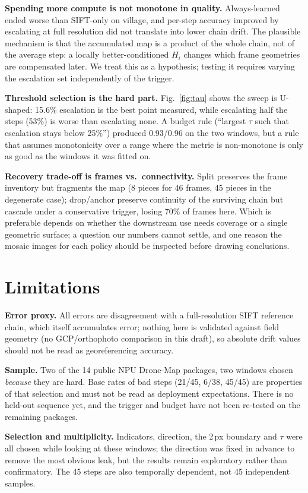 \documentclass[conference]{IEEEtran}
\begin{document}
\textbf{Spending more compute is not monotone in quality.} Always-learned
ended worse than SIFT-only on village, and per-step accuracy improved by
escalating at full resolution did not translate into lower chain drift. The
plausible mechanism is that the accumulated map is a product of the whole
chain, not of the average step: a locally better-conditioned $H_i$ changes
which frame geometries are compensated later. We treat this as a hypothesis;
testing it requires varying the escalation set independently of the trigger.

\textbf{Threshold selection is the hard part.} Fig.~\ref{fig:tau} shows the
sweep is U-shaped: 15.6\% escalation is the best point measured, while
escalating half the steps (53\%) is worse than escalating none. A budget rule
(``largest $\tau$ such that escalation stays below 25\%'') produced 0.93/0.96
on the two windows, but a rule that assumes monotonicity over a range where
the metric is non-monotone is only as good as the windows it was fitted on.

\textbf{Recovery trade-off is frames vs.\ connectivity.} Split preserves the
frame inventory but fragments the map (8 pieces for 46 frames, 45 pieces in
the degenerate case); drop/anchor preserve continuity of the surviving chain
but cascade under a conservative trigger, losing 70\% of frames here. Which is
preferable depends on whether the downstream use needs coverage or a single
geometric surface; a question our numbers cannot settle, and one reason the
mosaic images for each policy should be inspected before drawing conclusions.

\section{Limitations}
\textbf{Error proxy.} All errors are disagreement with a full-resolution SIFT
reference chain, which itself accumulates error; nothing here is validated
against field geometry (no GCP/orthophoto comparison in this draft), so
absolute drift values should not be read as georeferencing accuracy.

\textbf{Sample.} Two of the 14 public NPU Drone-Map packages, two windows
chosen \emph{because} they are hard. Base rates of bad steps (21/45, 6/38,
45/45) are properties of that selection and must not be read as deployment
expectations. There is no held-out sequence yet, and the trigger and budget
have not been re-tested on the remaining packages.

\textbf{Selection and multiplicity.} Indicators, direction, the 2\,px
boundary and $\tau$ were all chosen while looking at these windows; the
direction was fixed in advance to remove the most obvious leak, but the
results remain exploratory rather than confirmatory. The 45 steps are also
temporally dependent, not 45 independent samples.
\end{document}
